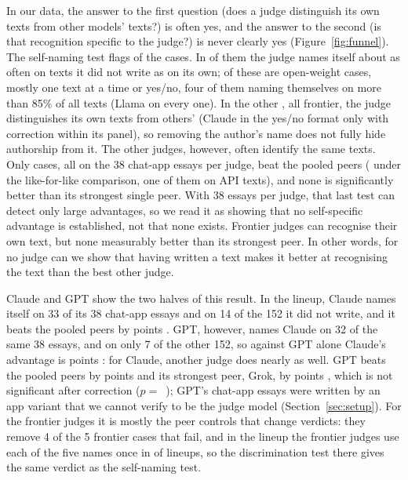In our data, the answer to the first question (does a judge distinguish its
own texts from other models' texts?) is often yes, and the answer to the
second (is that recognition specific to the judge?) is never clearly yes
(Figure~\ref{fig:funnel}). The self-naming
test flags \CVflagged{} of the \CVcells{} cases. In \CVfailFA{} of them the
judge names itself about as often on texts it did not write as on its own;
\CVopenFlagged{} of these are open-weight cases, mostly one text at a time or
yes/no, four of them naming themselves on more than 85\% of all texts (Llama
on every one). In
the other \CVdisc{}, all frontier, the judge distinguishes its own texts from
others' (Claude in the yes/no format only with correction within its panel), so
removing the author's name does not fully hide authorship from it. The other
judges, however, often identify the same texts. Only \CVbothAttr{} cases, all on
the 38 chat-app essays per judge, beat the pooled peers (\CXLikeForLike{}
under the like-for-like comparison, one of them on API texts), and none is
significantly better than its strongest single peer. With 38 essays per judge, that last test can detect
only large advantages, so we read it as showing that no self-specific
advantage is established, not that none exists. Frontier judges can recognise
their own text, but none measurably better than its strongest peer. In other
words, for no judge can we show that having written a text makes it better at
recognising the text than the best other judge.

Claude and GPT show the two halves of this result. In the lineup, Claude names
itself on 33 of its 38 chat-app essays and on 14 of the 152 it did not write,
and it beats the pooled peers by \ClaudeAdvLineup{} points
\ClaudeAdvLineupCI{}. GPT, however, names Claude on 32 of the same 38 essays,
and on only 7 of the other 152, so against GPT alone Claude's advantage is
\CRClaudeVsBestPeer{} points \CRClaudeVsBestPeerCI{}: for Claude, another
judge does nearly as well. GPT beats the pooled peers by \GPTAdvLineup{}
points \GPTAdvLineupCI{} and its strongest peer, Grok, by \CXGPTvsGrok{} points
\CXGPTvsGrokCI{}, which is not significant after correction
($p=$~\CXGPTvsGrokHolm{}); GPT's chat-app essays were written by an app variant
that we cannot verify to be the judge model (Section~\ref{sec:setup}). For the
frontier judges it is mostly the peer controls that change verdicts: they
remove 4 of the 5 frontier cases that fail, and in the lineup the frontier
judges use each of the five names once in \CROneToOneChat{} of lineups, so the
discrimination test there gives the same verdict as the self-naming test.

